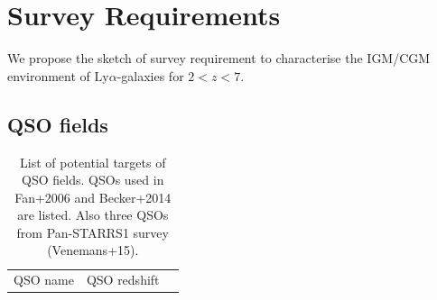 \documentclass[useAMS,usenatbib,twocolumn]{mn2e}
\newcommand{\LyA}{\mbox{Ly}\alpha}
\begin{document}
\section{Survey Requirements}
We propose the sketch of survey requirement to characterise the IGM/CGM 
environment of $\LyA$-galaxies for $2<z<7$.

\subsection{QSO fields}
\begin{table}
\centering
\caption{List of potential targets of QSO fields. QSOs used in Fan+2006 and 
Becker+2014 are listed. Also three QSOs from Pan-STARRS1 survey (Venemans+15).} \label{table:qso_field}
\begin{tabular}{lll}
\hline
QSO name                               & QSO redshift  &         \\ 


\end{tabular}
\end{table}
\end{document}
